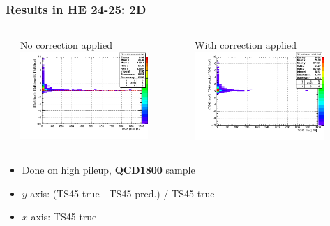 \documentclass[bigger]{beamer}
\providecommand{\alert}[1]{\textbf{#1}}
\begin{document}
\begin{frame}
\frametitle{Results in HE 24-25: 2D}
\label{sec-3-3-14}
\begin{columns} %
\label{sec-3-3-14-1}
\begin{column}{0.55\textwidth}
\label{sec-3-3-14-1-1}

\centering
No correction applied
\includegraphics[width=0.8\textwidth]{fig/delta_uncorrected_QCD1800_ring_3.png}
\end{column}
\begin{column}{0.55\textwidth}
\label{sec-3-3-14-1-2}

\centering
With correction applied
\includegraphics[width=0.8\textwidth]{fig/delta_corrected_QCD1800_ring_3.png}
\end{column}
\end{columns}
\label{sec-3-3-14-2}
\begin{itemize}

\item Done on high pileup, \alert{QCD1800} sample
\label{sec-3-3-14-2-1}%

\item $y$-axis: (TS45 true - TS45 pred.) / TS45 true
\label{sec-3-3-14-2-2}%

\item $x$-axis: TS45 true
\label{sec-3-3-14-2-3}%

\end{itemize} %
\end{frame}
\end{document}
